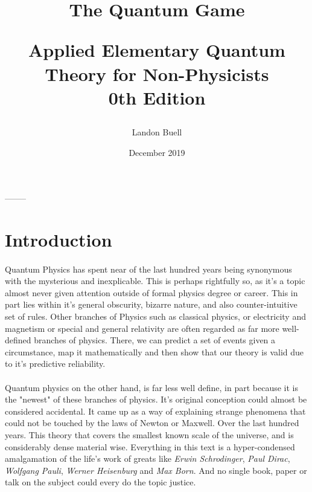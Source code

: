 \documentclass[12pt,letterpaper]{book}
\begin{document}

\title{
\begin{Huge}
The Quantum Game\\
\end{Huge}
\vspace*{5mm}
\Large Applied Elementary Quantum Theory for Non-Physicists \\
0th Edition}
\author{Landon Buell}
\date{December 2019}
\maketitle



\begin{center}
--------
\end{center}


\tableofcontents
\pagebreak


\section*{Introduction}
\paragraph*{}Quantum Physics has spent near of the last hundred years being synonymous with the mysterious and inexplicable. This is perhaps rightfully so, as it's a topic almost never given attention outside of formal physics degree or career. This in part lies within it's general obscurity, bizarre nature, and also counter-intuitive set of rules. Other branches of Physics such as classical physics, or electricity and magnetism or special and general relativity are often regarded as far more well-defined branches of physics. There, we can predict a set of events given a circumstance, map it mathematically and then show that our theory is valid due to it's predictive reliability.
\paragraph*{}Quantum physics on the other hand, is far less well define, in part because it is the "newest" of these branches of physics. It's original conception could almost be considered accidental. It came up as a way of explaining strange phenomena that could not be touched by the laws of Newton or Maxwell. Over the last hundred years. This theory that covers the smallest known scale of the universe, and is considerably dense material wise. Everything in this text is a hyper-condensed amalgamation of the life's work of greats like \textit{Erwin Schrodinger}, \textit{Paul Dirac}, \textit{Wolfgang Pauli}, \textit{Werner Heisenburg} and \textit{Max Born}. And no single book, paper or talk on the subject could every do the topic justice.
\end{document}
